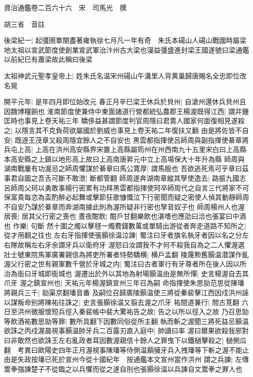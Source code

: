資治通鑑卷二百六十六　宋　司馬光　撰

胡三省　音註

後梁紀一|{
	起彊圉單闋盡著雍執徐七月凡一年有奇　朱氏本碭山人碭山戰國時屬梁地太祖以宣武節度使創業宣武軍治汴州古大梁也寖益彊盛進封梁王國遂號曰梁通鑑以前紀巳有蕭梁故此稱曰後梁}


太祖神武元聖孝皇帝上|{
	姓朱氏名温宋州碭山午溝里人背黄巢歸唐賜名全忠即位改名晃}


開平元年|{
	是年四月即位始改元}
春正月辛巳梁王休兵於貝州|{
	自滄州還休兵貝州且因魏博糧餉也}
淮南節度使兼侍中東面諸道行營都統弘農郡王楊渥既得江西|{
	謂并鍾匡時也事見上卷天祐三年}
驕侈益甚謂節度判官周隱曰君賣人國家何面復相見遂殺之|{
	以隱言其不克負荷欲屬國於劉威也事見上卷天祐二年復扶又翻}
由是將佐皆不自安|{
	既逐王茂章又殺周隱宜餘人之不自安也}
黑雲都指揮使呂師周與副指揮使綦章將兵屯上高|{
	上高在洪州高安縣界宋置上高縣屬筠州在州西南九十五里宋白曰上高縣本高安縣之上鎮以地形高上故曰上高南唐昇元中立上高場保大十年升為縣}
師周與湖南戰屢有功渥忌之師周懼謀於綦章曰馬公寛厚|{
	謂馬殷也}
吾欲逃死焉可乎章曰茲事君自圖之吾舌可斷不敢泄|{
	斷都管翻}
師周遂奔湖南章縱其孥使逸去|{
	路振九國志呂師周父珂以勇敢事楊行密累有功拜黑雲都指揮使珂卒師周代之自言三代將家不可保富貴每恣為盃酌醉必起舞或擊節狂歌慷慨泣下行密聞而疑之密使人偵其動靜師周不自安乃謀於綦章而奔湖南據此則為渥所疑非行密也孥音奴子也}
師周楊州人也渥居喪|{
	居其父行密之喪也}
晝夜酣飲|{
	酣戶甘翻樂飲也湛嗜也應劭曰洽也張宴曰中酒也}
作樂|{
	句斷}
然十圍之燭以擊毬一燭費錢數萬或單騎出游從者奔走道路不知所之|{
	從才用翻之往也}
左右牙指揮使張顥徐温泣諫|{
	蜀注曰牙者旗名執牙者因以名之分左右隊故稱左右牙余謂牙兵以衛府牙}
渥怒曰汝謂我不才何不殺我自為之二人懼渥選壯士號東院馬軍廣署親信為將吏所署者恃勢驕横|{
	横戶孟翻}
陵蔑勲舊顥温潜謀作亂渥父行密之世有親軍數千營於牙城之内|{
	蜀注曰古者軍行有牙尊者所在後人因以所治為衙曰牙城即衙城也}
渥遷出於外以其地為射場顥温由是無所憚|{
	史言楊渥自去其爪牙}
渥之鎮宣州也|{
	天祐元年楊渥鎮宣州三年召為嗣}
命指揮使朱思勍范思從陳璠將親兵三千|{
	勍渠京翻璠音番}
及嗣位召歸廣陵顥温使三將從秦裴擊江西因戍洪州誣以謀叛命别將陳祐往誅之|{
	史言張顥徐温又翦去渥之爪牙}
祐間道兼行|{
	間古莧翻}
六日至洪州微服懷短兵徑入秦裴帳中裴大驚祐告之故|{
	告之以所以徑入之故}
乃召思勍等飲酒祐數思勍等罪|{
	數所具翻下因數同俗從所主翻}
執而斬之渥聞三將死益忌顥温欲誅之丙戍渥晨視事顥温帥牙兵二百露刃直入庭中|{
	帥讀曰率}
渥曰爾果欲殺我邪對曰非敢然也欲誅王左右亂政者耳因數渥親信十餘人之罪曳下以鐵檛擊殺之|{
	檛側瓜翻　考異曰歐陽史四年正月渥視事陳璠等侍側温顥擁牙兵入拽璠等下斬之渥不能止由是失政按璠已死於宣州今從十國紀年　按通鑑本文宣州當作洪州}
謂之兵諫|{
	左傳鬻拳強諫楚子不從臨之以兵懼而從之遂自刖也張顥徐温以兵諫自文鬻拳之罪人也}
